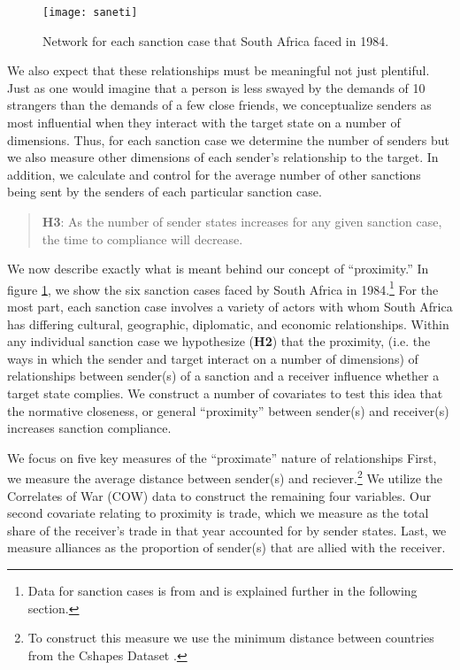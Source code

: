 \begin{figure}[ht]
	\centering
	\texttt{[image: saneti]}
	\caption{Network for each sanction case that South Africa faced in 1984.}
	\label{fig:saneti}
\end{figure}
\FloatBarrier

We also expect that these relationships must be meaningful not just plentiful. Just as one would imagine that a person is less swayed by the demands of 10 strangers than the demands of a few close friends, we conceptualize senders as most influential when they interact with the target state on a number of dimensions.  Thus, for each sanction case we determine the number of senders but we also measure other dimensions of each sender's relationship to the target. In addition, we calculate and control for the average number of other sanctions being sent by the senders of each particular sanction case.

\begin{quote}
	\textbf{H3}: As the number of sender states increases for any given sanction case, the time to compliance will decrease. 
\end{quote}

 We now describe exactly what is meant behind our concept of ``proximity.'' In figure \ref{fig:saneti}, we show the six sanction cases faced by South Africa in 1984.\footnote{Data for sanction cases is from \citet{morgan2009threat} and is explained further in the following section.} For the most part, each sanction case involves a variety of actors with whom South Africa has differing cultural, geographic, diplomatic, and economic relationships. Within any individual sanction case we hypothesize (\textbf{H2}) that the proximity, (i.e. the ways in which the sender and target interact on a number of dimensions) of relationships between sender(s) of a sanction and a receiver influence whether a target state complies. We construct a number of covariates to test this idea that the normative closeness, or general ``proximity'' between sender(s) and receiver(s) increases sanction compliance. 

We focus on five key measures of the ``proximate'' nature of relationships First, we measure the average distance between sender(s) and reciever.\footnote{To construct this measure we use the minimum distance between countries from the Cshapes Dataset \citep{weidmann2010geography}.} We utilize the Correlates of War (COW) data to construct the remaining four variables. Our second covariate relating to proximity is trade, which we measure as the total share of the receiver's trade in that year accounted for by sender states. Last, we measure alliances as the proportion of sender(s) that are allied with the receiver. 

